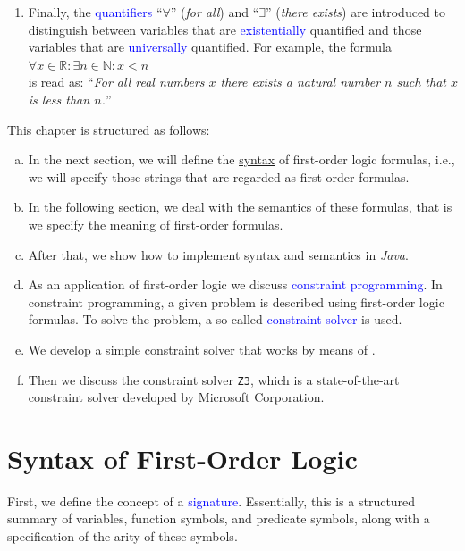 \begin{enumerate}
      $x > 1 \rightarrow x + 7 < x \cdot  7$.
\item Finally, the \textcolor{blue}{quantifiers} ``$\forall$'' (\emph{for all}) and
      ``$\exists$'' (\emph{there exists}) are introduced to distinguish between variables that are
      \textcolor{blue}{existentially} quantified and those variables that are \textcolor{blue}{universally}
      quantified.  For example, the formula 
      \\[0.2cm]
      \hspace*{1.3cm}
      $\forall x \in \mathbb{R}: \exists n \in \mathbb{N}: x < n$
      \\[0.2cm]
      is read as: ``\textsl{For all real numbers $x$ there exists a natural number $n$ such that $x$ is less
        than $n$.}''
\end{enumerate}
This chapter is structured as follows:
\begin{enumerate}[(a)]
\item In the next section, we will define the \href{https://en.wikipedia.org/wiki/Syntax}{syntax} of
      first-order logic formulas, i.e., we will specify those strings that are regarded as first-order
      formulas.
\item In the following section, we deal with the
      \href{https://en.wikipedia.org/wiki/Semantics}{semantics} of these formulas, that is we specify the 
      meaning of first-order formulas.
\item After that, we show how to implement syntax and semantics in \textsl{Java}.
\item As an application of first-order logic we discuss \textcolor{blue}{constraint programming}.
      In constraint programming, a given problem is described using first-order logic formulas.
      To solve the problem, a so-called \textcolor{blue}{constraint solver} is used.
\item We develop a simple constraint solver that works by means of .
\item Then we discuss the constraint solver \texttt{Z3}, which is a state-of-the-art constraint solver
      developed by Microsoft Corporation.
\end{enumerate}

\section{Syntax of First-Order Logic}
First, we define the concept of a \textcolor{blue}{signature}. Essentially, this is a
structured summary of variables, function symbols, and predicate symbols, along with a specification of the
arity of these symbols. 

